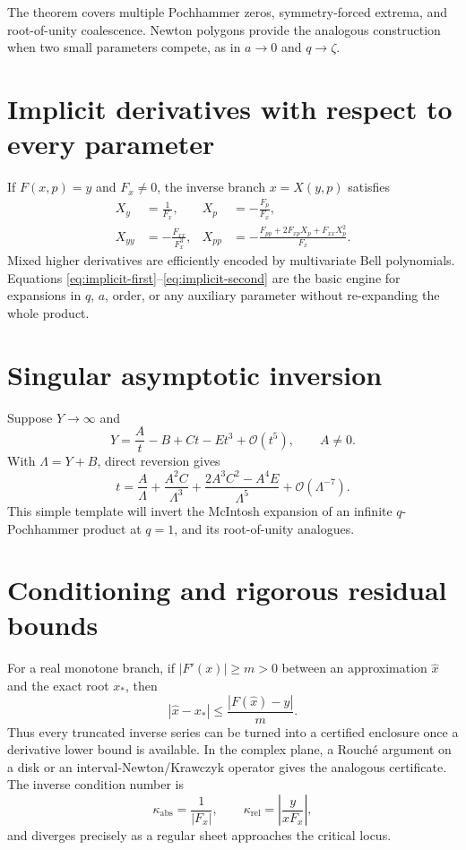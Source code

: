 \documentclass[11pt,oneside]{book}
\theoremstyle{definition}
\theoremstyle{remark}
\newcommand{\OO}{\mathcal{O}}
\begin{document}
The theorem covers multiple Pochhammer zeros, symmetry-forced extrema, and
root-of-unity coalescence.  Newton polygons provide the analogous construction
when two small parameters compete, as in $a\to0$ and $q\to\zeta$.

\section{Implicit derivatives with respect to every parameter}
If $F(x,p)=y$ and $F_x\ne0$, the inverse branch $x=X(y,p)$ satisfies
\begin{align}
 X_y&=\frac1{F_x},&
 X_p&=-\frac{F_p}{F_x},\label{eq:implicit-first}\\
 X_{yy}&=-\frac{F_{xx}}{F_x^3},&
 X_{pp}&=-\frac{F_{pp}+2F_{xp}X_p+F_{xx}X_p^2}{F_x}.
 \label{eq:implicit-second}
\end{align}
Mixed higher derivatives are efficiently encoded by multivariate Bell
polynomials.  Equations \eqref{eq:implicit-first}--\eqref{eq:implicit-second}
are the basic engine for expansions in $q$, $a$, order, or any auxiliary
parameter without re-expanding the whole product.

\section{Singular asymptotic inversion}
Suppose $Y\to\infty$ and
\[
 Y=\frac{A}{t}-B+Ct-Et^3+\OO(t^5),\qquad A\ne0.
\]
With $\Lambda=Y+B$, direct reversion gives
\begin{equation}\label{eq:singular-master}
 t=\frac{A}{\Lambda}
 +\frac{A^2C}{\Lambda^3}
 +\frac{2A^3C^2-A^4E}{\Lambda^5}
 +\OO(\Lambda^{-7}).
\end{equation}
This simple template will invert the McIntosh expansion of an infinite
$q$-Pochhammer product at $q=1$, and its root-of-unity analogues.

\section{Conditioning and rigorous residual bounds}
For a real monotone branch, if $|F'(x)|\ge m>0$ between an approximation
$\widehat x$ and the exact root $x_*$, then
\[
 |\widehat x-x_*|\le \frac{|F(\widehat x)-y|}{m}.
\]
Thus every truncated inverse series can be turned into a certified enclosure
once a derivative lower bound is available.  In the complex plane, a Rouch\'e
argument on a disk or an interval-Newton/Krawczyk operator gives the analogous
certificate.  The inverse condition number is
\[
 \kappa_{\mathrm{abs}}=\frac1{|F_x|},\qquad
 \kappa_{\mathrm{rel}}=\left|\frac{y}{xF_x}\right|,
\]
and diverges precisely as a regular sheet approaches the critical locus.
\end{document}
